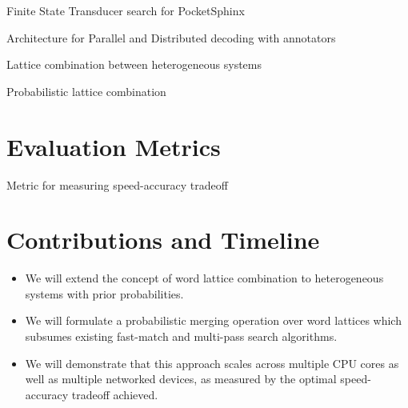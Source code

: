 \documentclass{article}
\begin{document}
Finite State Transducer search for PocketSphinx

Architecture for Parallel and Distributed decoding with annotators

Lattice combination between heterogeneous systems

Probabilistic lattice combination

\section{Evaluation Metrics}
\label{sec:eval}

Metric for measuring speed-accuracy tradeoff

\section{Contributions and Timeline}
\label{sec:contrib}

\begin{itemize}
\item We will extend the concept of word lattice combination to
  heterogeneous systems with prior probabilities.
\item We will formulate a probabilistic merging operation over word
  lattices which subsumes existing fast-match and multi-pass search
  algorithms.
\item We will demonstrate that this approach scales across multiple
  CPU cores as well as multiple networked devices, as measured by the
  optimal speed-accuracy tradeoff achieved.
\end{itemize}



\end{document}
